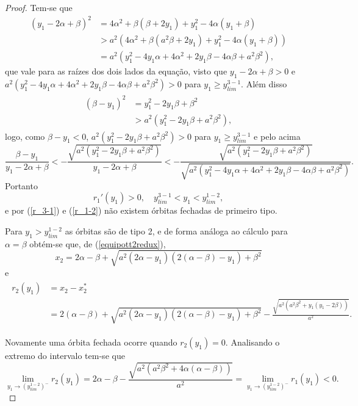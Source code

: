 \begin{proof}
Tem-se que
\begin{align*}
(y_1 - 2 \alpha + \beta)^2&=4\alpha^2  + \beta(\beta+2 y_1) + y_1^2 - 4 \alpha (y_1+\beta)
\\&>a^2 (4 \alpha^2 +\beta(a^2\beta+2y_1)+y_1^2 - 4 \alpha (y_1  +\beta ))
\\&=a^2 (y_1^2 - 4 y_1 \alpha + 4 \alpha^2 + 2 y_1 \beta - 4 \alpha \beta + a^2 \beta^2),
\end{align*}
que vale para as raízes dos dois lados da equação, visto que $y_1 - 2 \alpha + \beta>0$ e $a^2 (y_1^2 - 4 y_1 \alpha + 4 \alpha^2 + 2 y_1 \beta - 4 \alpha \beta + a^2 \beta^2)>0$ para $y_1\geq y_{lim}^{3-1}$. Além disso
\begin{gather}
\begin{aligned}
\label{ineq1}
(\beta-y_1)^2&=y_1^2-2y_1\beta+\beta^2
\\&>a^2 (y_1^2 - 2 y_1 \beta + a^2 \beta^2),
\end{aligned}    
\end{gather}
logo, como $\beta-y_1<0$, $a^2 (y_1^2 - 2 y_1 \beta + a^2 \beta^2)>0$ para $y_1\geq y_{lim}^{3-1}$ e pelo acima
$$
\frac{\beta-y_1}{y_1 - 2 \alpha + \beta}< -\frac{\sqrt{a^2 (y_1^2 - 2 y_1 \beta + a^2 \beta^2)}}{y_1 - 2 \alpha + \beta}<-\frac{\sqrt{a^2 (y_1^2 - 2 y_1 \beta + a^2 \beta^2)}}{\sqrt{a^2 (y_1^2 - 4 y_1 \alpha + 4 \alpha^2 + 2 y_1 \beta - 4 \alpha \beta + a^2 \beta^2)}}.
$$
Portanto
$$
r_1'(y_1)>0,\quad y_{lim}^{3-1}< y_1<y_{lim}^{1-2},
$$
e por (\ref{r_3-1}) e (\ref{r_1-2}) não existem órbitas fechadas de primeiro tipo.

Para $y_1>y_{lim}^{1-2}$ as órbitas são de tipo 2, e de forma análoga ao cálculo para $\alpha=\beta$ obtém-se que, de (\ref{equipott2redux}),
$$
x_2=2 \alpha-\beta+\sqrt{ a^2(2\alpha-y_1) (2(\alpha-\beta)-y_1)+\beta^2}
$$
e
\begin{gather}
\begin{aligned}
\label{r_2}
r_2(y_1)&=x_2-x_2^*
\\&=
2(\alpha-\beta)+\sqrt{ a^2(2\alpha-y_1) (2(\alpha-\beta)-y_1)+\beta^2}-\frac{\sqrt{ a^2(a^2 \beta^2 +  y_1 (y_1 - 2 \beta))}}{ a^2}.\nonumber
\end{aligned}
\end{gather}

Novamente uma órbita fechada ocorre quando $r_2(y_1)=0$. Analisando o extremo do intervalo tem-se que
\begin{equation}
\label{r_2_1-2}
    \lim_{y_1\rightarrow (y_{lim}^{1-2})^-}r_2(y_1)=2\alpha-\beta-\frac{\sqrt{ a^2(a^2 \beta^2 +  4\alpha (\alpha - \beta))}}{ a^2}=\lim_{y_1\rightarrow (y_{lim}^{1-2})^-}r_1(y_1)<0.
    \end{equation}


\end{proof}
